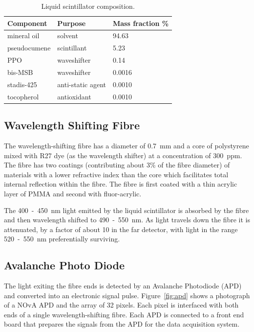 \begin{table}
  \centering
  \begin{tabular}{ l | l | l }
    Component & Purpose & Mass fraction \% \\ \hline
    mineral oil & solvent & 94.63 \\
    pseudocumene & scintillant & 5.23 \\
    PPO & waveshifter & 0.14 \\
    bis-MSB & waveshifter & 0.0016 \\
    stadis-425 & anti-static agent & 0.0010 \\
    tocopherol & antioxidant & 0.0010 \\
  \end{tabular}
  \caption{Liquid scintillator
    composition. \cite{scintillatorComp} }
  \label{tab:scintComp}
\end{table}


\subsection{Wavelength Shifting Fibre}
The wavelength-shifting fibre has a diameter of 0.7~mm and a core of
polystyrene mixed with R27 dye (as the wavelength shifter) at a
concentration of 300~ppm. The fibre has two
coatings (contributing about 3\% of the fibre diameter) of materials
with a lower refractive index than the core
which facilitates total internal reflection within the fibre. The
fibre is first coated with a thin acrylic layer of PMMA and second
with fluor-acrylic. 

The 400~-~450~nm light emitted by the liquid scintillator is absorbed
by the fibre and then wavelength shifted to 490~-~550~nm. 
As light travels down the fibre it is attenuated, by a factor of about
10 in the far detector, with light in the range 520~-~550~nm
preferentially surviving. 


\subsection{Avalanche Photo Diode}

The light exiting the fibre ends is detected by an Avalanche
Photodiode (APD) and converted into an
electronic signal pulse. 
Figure~\ref{fig:apd} shows a photograph of a NOvA APD
and the array
of 32 pixels. Each pixel is interfaced with both ends of a single
wavelength-shifting fibre. Each APD is connected to a front end board
that prepares the signals from the APD for the data acquisition
system. 

